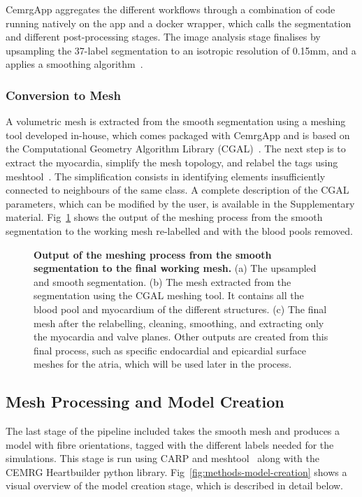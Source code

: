 CemrgApp aggregates the different workflows through a combination of code running natively on the app and 
a docker wrapper, which calls the segmentation and different post-processing stages. 
The image analysis stage finalises by upsampling the 37-label segmentation to an isotropic resolution of 0.15mm, 
and a applies a smoothing algorithm~\cite{crozier2016_segsmooth}. 

\subsubsection{Conversion to Mesh}\label{sec:meshing}
A volumetric mesh is extracted from the smooth segmentation using a meshing tool developed in-house, 
which comes packaged with CemrgApp and is based on the Computational Geometry Algorithm Library (CGAL)~\cite{cgal}. 
The next step is to extract the myocardia, simplify the mesh topology, and relabel the tags using 
meshtool~\cite{Neic2020-meshtool}.
The simplification consists in identifying elements insufficiently connected to neighbours of the same class.
A complete description of the CGAL parameters, which can be modified by the user, 
is available in the Supplementary material. 
Fig~\ref{fig:methods-mesh} shows the output of the meshing process from the smooth segmentation 
to the working mesh re-labelled and with the blood pools removed.

\begin{figure}[hbpt]
    \caption{
        \textbf{Output of the meshing process from the smooth segmentation to the final working mesh.}
        (a) The upsampled and smooth segmentation. 
        (b) The mesh extracted from the segmentation using the CGAL meshing tool. 
        It contains all the blood pool and myocardium of the different structures.
        (c) The final mesh after the relabelling, cleaning, smoothing, and 
        extracting only the myocardia and valve planes. 
        Other outputs are created from this final process, such as specific endocardial and 
        epicardial surface meshes for the atria, which will be used later in the process.
    }
    \label{fig:methods-mesh}
\end{figure}

\subsection{Mesh Processing and Model Creation}\label{sec:model-creation}
The last stage of the pipeline included takes the smooth mesh and produces 
a model with fibre orientations, tagged with the different labels needed for the simulations.
This stage is run using CARP and meshtool~\cite{Neic2020-meshtool,carp-2003} along with 
the CEMRG Heartbuilder python library. 
Fig~\ref{fig:methods-model-creation} shows a visual overview of the model creation stage, 
which is described in detail below.


